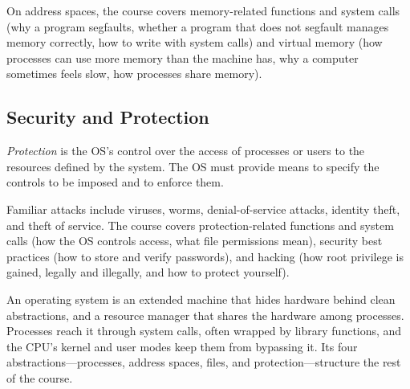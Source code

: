 On address spaces, the course covers memory-related functions and system calls (why a program segfaults, whether a program that does not segfault manages memory correctly, how to write  with system calls) and virtual memory (how processes can use more memory than the machine has, why a computer sometimes feels slow, how processes share memory).

\subsection{Security and Protection}

\begin{definition}[Protection]
  \emph{Protection} is the OS's control over the access of processes or users to the resources defined by the system. The OS must provide means to specify the controls to be imposed and to enforce them.
\end{definition}

Familiar attacks include viruses, worms, denial-of-service attacks, identity theft, and theft of service. The course covers protection-related functions and system calls (how the OS controls access, what file permissions mean), security best practices (how to store and verify passwords), and hacking (how root privilege is gained, legally and illegally, and how to protect yourself).

\begin{keypoint}[Summary]
  An operating system is an extended machine that hides hardware behind clean abstractions, and a resource manager that shares the hardware among processes. Processes reach it through system calls, often wrapped by library functions, and the CPU's kernel and user modes keep them from bypassing it. Its four abstractions---processes, address spaces, files, and protection---structure the rest of the course.
\end{keypoint}
